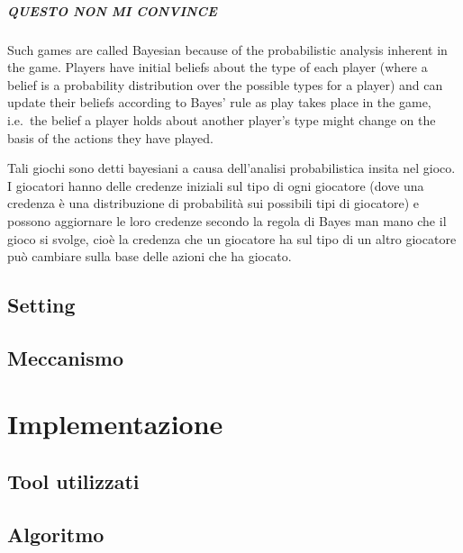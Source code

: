\documentclass{report}
\begin{document}
\paragraph{QUESTO NON MI CONVINCE} Such games are called Bayesian because of the probabilistic analysis inherent in the game. Players have initial beliefs about the type of each player (where a belief is a probability distribution over the possible types for a player) and can update their beliefs according to Bayes' rule as play takes place in the game, i.e.\ the belief a player holds about another player's type might change on the basis of the actions they have played.

Tali giochi sono detti bayesiani a causa dell'analisi probabilistica insita nel gioco. I giocatori hanno delle credenze iniziali sul tipo di ogni giocatore (dove una credenza è una distribuzione di probabilità sui possibili tipi di giocatore) e possono aggiornare le loro credenze secondo la regola di Bayes man mano che il gioco si svolge, cioè la credenza che un giocatore ha sul tipo di un altro giocatore può cambiare sulla base delle azioni che ha giocato.







\section{Setting}

\section{Meccanismo}

\chapter{Implementazione}

\section{Tool utilizzati}

\section{Algoritmo}


\newpage{}
\listoffigures
\end{document}
